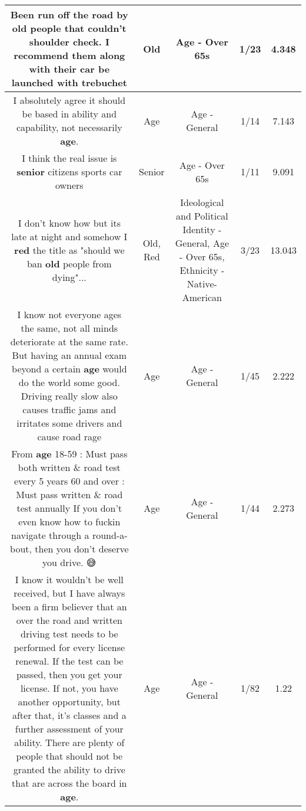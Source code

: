\documentclass[11pt]{article}
\newlength\mylength
\begin{document}
\begin{center}
\begin{longtable}{|C{.65\mylength}|C{.30\mylength}|C{.12\mylength}|C{.12\mylength}|C{.12\mylength}|}
  \small Been run off the road by \textbf{old} people that couldn't shoulder check. I recommend them along with their car be launched with trebuchet\normalsize   & Old & Age - Over 65s & 1/23 & 4.348 \\  \hline
  \small I absolutely agree it should be based in ability and capability, not necessarily \textbf{age}.\normalsize   & Age & Age - General & 1/14 & 7.143 \\  \hline
  \small I think the real issue is \textbf{senior} citizens sports  car owners\normalsize   & Senior & Age - Over 65s & 1/11 & 9.091 \\  \hline
  \small I don't know how but its late at night and somehow I \textbf{r\textbf{ed}} the title as "should we ban \textbf{old} people from dying"...\normalsize   & Old, Red &  Ideological and Political Identity - General, Age - Over 65s, Ethnicity - Native-American & 3/23 & 13.043 \\  \hline
  \small I know not everyone ages the same, not all minds deteriorate at the same rate. But having an annual exam beyond a certain \textbf{age} would do the world some good. Driving really slow also causes traffic jams and irritates some drivers and cause road rage\normalsize   & Age & Age - General & 1/45 & 2.222 \\  \hline
  \small From \textbf{age} 18-59 : Must pass both written \& road test every 5 years 60 and over : Must pass written \& road test annually If you don't even know how to fuckin navigate through a round-a-bout, then you don't deserve you drive. 😅\normalsize   & Age & Age - General & 1/44 & 2.273 \\  \hline
  \small I know it wouldn't be well received, but I have always been a firm believer that an over the road and written driving test needs to be performed for every license renewal.  If the test can be passed, then you get your license.  If not, you have another opportunity, but after that, it's classes and a further assessment of your ability.  There are plenty of people that should not be granted the ability to drive that are across the board in \textbf{age}.\normalsize   & Age & Age - General & 1/82 & 1.22 \\  \hline

\end{longtable}
\end{center}
\end{document}
